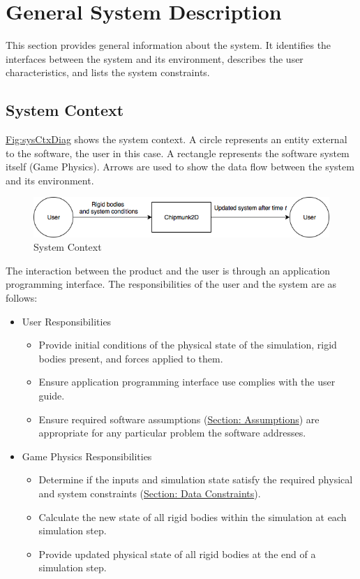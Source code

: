 \documentclass[12pt]{article}
\begin{document}
\section{General System Description}
\label{Sec:GenSysDesc}
This section provides general information about the system. It identifies the interfaces between the system and its environment, describes the user characteristics, and lists the system constraints.

\subsection{System Context}
\label{Sec:SysContext}
\hyperref[Figure:sysCtxDiag]{Fig:sysCtxDiag} shows the system context. A circle represents an entity external to the software, the user in this case. A rectangle represents the software system itself (Game Physics). Arrows are used to show the data flow between the system and its environment.

\begin{figure}
\begin{center}
\includegraphics[width=\textwidth]{../../../datafiles/GamePhysics/sysctx.png}
\caption{System Context}
\label{Figure:sysCtxDiag}
\end{center}
\end{figure}
The interaction between the product and the user is through an application programming interface. The responsibilities of the user and the system are as follows:

\begin{itemize}
\item{User Responsibilities}
\begin{itemize}
\item{Provide initial conditions of the physical state of the simulation, rigid bodies present, and forces applied to them.}
\item{Ensure application programming interface use complies with the user guide.}
\item{Ensure required software assumptions (\hyperref[Sec:Assumps]{Section: Assumptions}) are appropriate for any particular problem the software addresses.}
\end{itemize}
\item{Game Physics Responsibilities}
\begin{itemize}
\item{Determine if the inputs and simulation state satisfy the required physical and system constraints (\hyperref[Sec:DataConstraints]{Section: Data Constraints}).}
\item{Calculate the new state of all rigid bodies within the simulation at each simulation step.}
\item{Provide updated physical state of all rigid bodies at the end of a simulation step.}
\end{itemize}
\end{itemize}
\end{document}
